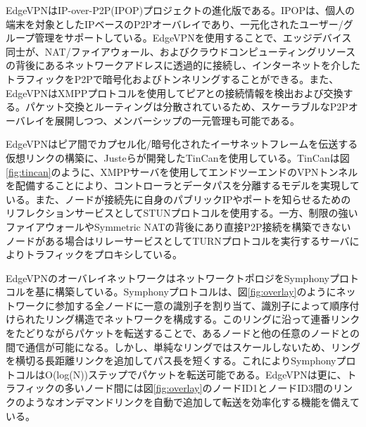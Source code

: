 EdgeVPNはIP-over-P2P(IPOP)プロジェクト\cite{ipop}の進化版である。IPOPは、個人の端末を対象としたIPベースのP2Pオーバレイであり、一元化されたユーザー/グループ管理をサポートしている。EdgeVPNを使用することで、エッジデバイス同士が、NAT/ファイアウォール、およびクラウドコンピューティングリソースの背後にあるネットワークアドレスに透過的に接続し、インターネットを介したトラフィックをP2Pで暗号化およびトンネリングすることができる。また、EdgeVPNはXMPPプロトコル\cite{xmpp}を使用してピアとの接続情報を検出および交換する。パケット交換とルーティングは分散されているため、スケーラブルなP2Pオーバレイを展開しつつ、メンバーシップの一元管理も可能である。

EdgeVPNはピア間でカプセル化/暗号化されたイーサネットフレームを伝送する仮想リンクの構築に、Justeら\cite{tincan}が開発したTinCanを使用している。TinCanは図\ref{fig:tincan}のように、XMPPサーバを使用してエンドツーエンドのVPNトンネルを配備することにより、コントローラとデータパスを分離するモデルを実現している。また、ノードが接続先に自身のパブリックIPやポートを知らせるためのリフレクションサービスとしてSTUNプロトコル\cite{stun}を使用する。一方、制限の強いファイアウォールやSymmetric NATの背後にあり直接P2P接続を構築できないノードがある場合はリレーサービスとしてTURNプロトコル\cite{turn}を実行するサーバによりトラフィックをプロキシしている。

EdgeVPNのオーバレイネットワークはネットワークトポロジをSymphonyプロトコル\cite{symphony}を基に構築している。Symphonyプロトコルは、図\ref{fig:overlay}のようにネットワークに参加する全ノードに一意の識別子を割り当て、識別子によって順序付けられたリング構造でネットワークを構成する。このリングに沿って連番リンクをたどりながらパケットを転送することで、あるノードと他の任意のノードとの間で通信が可能になる。しかし、単純なリングではスケールしないため、リングを横切る長距離リンクを追加してパス長を短くする。これによりSymphonyプロトコルはO(log(N))ステップでパケットを転送可能である。EdgeVPNは更に、トラフィックの多いノード間には図\ref{fig:overlay}のノードID1とノードID3間のリンクのようなオンデマンドリンクを自動で追加して転送を効率化する機能を備えている。

